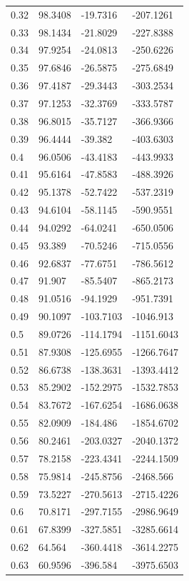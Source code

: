 \begin{tabular}{llll}
0.32 & 98.3408 & -19.7316 & -207.1261 \\
0.33 & 98.1434 & -21.8029 & -227.8388 \\
0.34 & 97.9254 & -24.0813 & -250.6226 \\
0.35 & 97.6846 & -26.5875 & -275.6849 \\
0.36 & 97.4187 & -29.3443 & -303.2534 \\
0.37 & 97.1253 & -32.3769 & -333.5787 \\
0.38 & 96.8015 & -35.7127 & -366.9366 \\
0.39 & 96.4444 & -39.382 & -403.6303 \\
0.4 & 96.0506 & -43.4183 & -443.9933 \\
0.41 & 95.6164 & -47.8583 & -488.3926 \\
0.42 & 95.1378 & -52.7422 & -537.2319 \\
0.43 & 94.6104 & -58.1145 & -590.9551 \\
0.44 & 94.0292 & -64.0241 & -650.0506 \\
0.45 & 93.389 & -70.5246 & -715.0556 \\
0.46 & 92.6837 & -77.6751 & -786.5612 \\
0.47 & 91.907 & -85.5407 & -865.2173 \\
0.48 & 91.0516 & -94.1929 & -951.7391 \\
0.49 & 90.1097 & -103.7103 & -1046.913 \\
0.5 & 89.0726 & -114.1794 & -1151.6043 \\
0.51 & 87.9308 & -125.6955 & -1266.7647 \\
0.52 & 86.6738 & -138.3631 & -1393.4412 \\
0.53 & 85.2902 & -152.2975 & -1532.7853 \\
0.54 & 83.7672 & -167.6254 & -1686.0638 \\
0.55 & 82.0909 & -184.486 & -1854.6702 \\
0.56 & 80.2461 & -203.0327 & -2040.1372 \\
0.57 & 78.2158 & -223.4341 & -2244.1509 \\
0.58 & 75.9814 & -245.8756 & -2468.566 \\
0.59 & 73.5227 & -270.5613 & -2715.4226 \\
0.6 & 70.8171 & -297.7155 & -2986.9649 \\
0.61 & 67.8399 & -327.5851 & -3285.6614 \\
0.62 & 64.564 & -360.4418 & -3614.2275 \\
0.63 & 60.9596 & -396.584 & -3975.6503 \\

\end{tabular}
